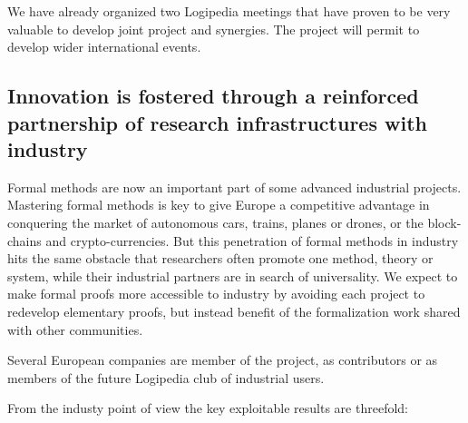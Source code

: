 We have already organized two {\sf Logipedia} meetings that have
proven to be very valuable to develop joint project and synergies.
The project will permit to develop wider international events.

\subsection{Innovation is fostered through a reinforced partnership of research
infrastructures with industry}

Formal methods are now an important part of some advanced
industrial projects. Mastering formal methods is key to
give Europe a competitive advantage in conquering the market of
autonomous cars, trains, planes or drones, or the block-chains and crypto-currencies. But this penetration of
formal methods in industry hits the same obstacle that researchers
often promote one method, theory or system, while their industrial
partners are in search of universality. We expect to make formal
proofs more accessible to industry by avoiding each project to
redevelop elementary proofs, but instead benefit of the formalization
work shared with other communities.

Several European companies are member of the project,
as contributors or as members of the future {\sf Logipedia}
club of industrial users.

From the industy point of view the key exploitable results are threefold:

